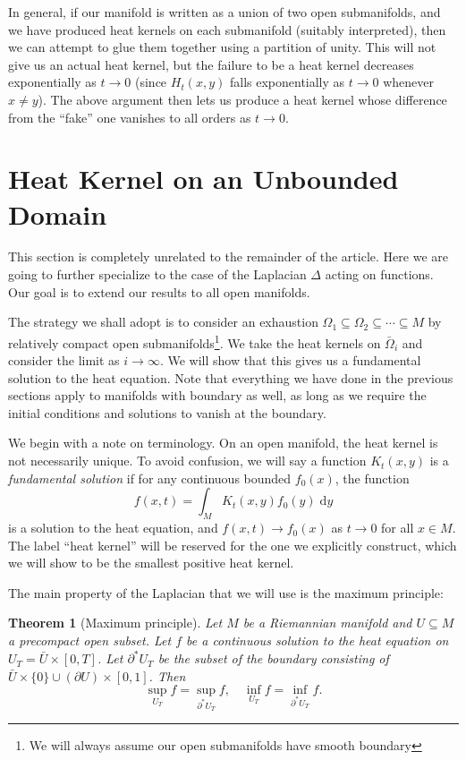 \documentclass{shortart}
\newtheorem{thm}{Theorem}[section]
\theoremstyle{definition}
\renewcommand\d{\mathrm{d}}
\begin{document}
In general, if our manifold is written as a union of two open submanifolds, and we have produced heat kernels on each submanifold (suitably interpreted), then we can attempt to glue them together using a partition of unity. This will not give us an actual heat kernel, but the failure to be a heat kernel decreases exponentially as $t \to 0$ (since $H_t(x, y)$ falls exponentially as $t \to 0$ whenever $x \not= y$). The above argument then lets us produce a heat kernel whose difference from the ``fake'' one vanishes to all orders as $t \to 0$.

\section{Heat Kernel on an Unbounded Domain}\label{section:unbounded-domain}
This section is completely unrelated to the remainder of the article. Here we are going to further specialize to the case of the Laplacian $\Delta$ acting on functions. Our goal is to extend our results to all open manifolds.

The strategy we shall adopt is to consider an exhaustion $\Omega_1 \subseteq \Omega_2 \subseteq \cdots \subseteq M$ by relatively compact open submanifolds\footnote{We will always assume our open submanifolds have smooth boundary}. We take the heat kernels on $\bar{\Omega}_i$ and consider the limit as $i \to \infty$. We will show that this gives us a fundamental solution to the heat equation. Note that everything we have done in the previous sections apply to manifolds with boundary as well, as long as we require the initial conditions and solutions to vanish at the boundary.

We begin with a note on terminology. On an open manifold, the heat kernel is not necessarily unique. To avoid confusion, we will say a function $K_t(x, y)$ is a \emph{fundamental solution} if for any continuous bounded $f_0(x)$, the function
\[
  f(x, t) = \int_M K_t(x, y) f_0(y) \;\d y
\]
is a solution to the heat equation, and $f(x, t) \to f_0(x)$ as $t \to 0$ for all $x \in M$. The label ``heat kernel'' will be reserved for the one we explicitly construct, which we will show to be the smallest positive heat kernel.

The main property of the Laplacian that we will use is the maximum principle:
\begin{thm}[Maximum principle]
  Let $M$ be a Riemannian manifold and $U \subseteq M$ a precompact open subset. Let $f$ be a continuous solution to the heat equation on $U_T = \bar{U} \times [0, T]$. Let $\partial^* U_T$ be the subset of the boundary consisting of $\bar{U} \times \{0\} \cup (\partial U) \times [0, 1]$. Then
  \[
    \sup_{U_T} f = \sup_{\partial^* U_T} f,\quad \inf_{U_T} f = \inf_{\partial^* U_T} f.
  \]
\end{thm}
\end{document}

